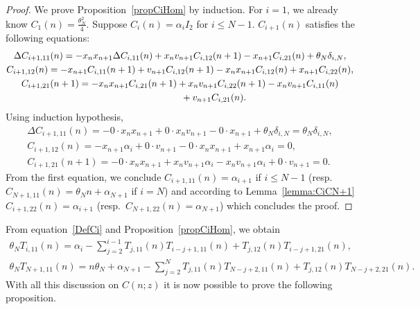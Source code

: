 \documentclass[pdftex]{sigma}%
\numberwithin{equation}{section}
\begin{document}
	\begin{proof}
		We prove Proposition~\ref{propCiHom} by induction.
		For $i=1$, we already know $C_1(n)=\frac{\theta_N^2}{4}$.
		Suppose $C_i(n)=\alpha_iI_2$ for $i\leqslant N-1$.
		$C_{i+1}(n)$ satisfies the following equations:
		\begin{gather*}
			\Delta C_{i+1,11}(n)=-x_nx_{n+1}\Delta C_{i,11}(n) +x_nv_{n+1}C_{i,12}(n+1)-x_{n+1}C_{i,21}(n)+\theta_N\delta_{i,N},
\\
C_{i+1,12}(n)=-x_{n+1}C_{i,11}(n+1)+v_{n+1}C_{i,12}(n+1)-x_nx_{n+1}C_{i,12}(n)+x_{n+1}C_{i,22}(n),
\\		
C_{i+1,21}(n+1)=-x_nx_{n+1}C_{i,21}(n+1)+x_nv_{n+1}C_{i,22}(n+1)-x_nv_{n+1}C_{i,11}(n)
\\ \hphantom{C_{i+1,21}(n+1)=}
{}+v_{n+1}C_{i,21}(n).
		\end{gather*}
		Using induction hypothesis,
		\begin{gather*}
			\Delta C_{i+1,11}(n)=-0 \cdot x_nx_{n+1} +0\cdot x_nv_{n+1}-0\cdot x_{n+1}+\theta_N\delta_{i,N}=\theta_N\delta_{i,N}, \\
			C_{i+1,12}(n)=-x_{n+1}\alpha_i+0\cdot v_{n+1}-0\cdot x_nx_{n+1}+x_{n+1}\alpha_i=0, \\
			C_{i+1,21}(n+1)=-0\cdot x_nx_{n+1}+x_nv_{n+1}\alpha_i-x_nv_{n+1}\alpha_i+0\cdot v_{n+1}=0.
		\end{gather*}
		From the first equation, we conclude $C_{i+1,11}(n)=\alpha_{i+1}$ if $i\leqslant N-1$ (resp.\ $C_{N+1,11}(n)=\theta_Nn+\alpha_{N+1}$ if $i=N$) and according to Lemma~\ref{lemma:CiCN+1} $C_{i+1,22}(n)=\alpha_{i+1}$ (resp.\ $C_{N+1,22}(n)=\alpha_{N+1}$) which concludes the proof.
\end{proof}

	From equation~\eqref{DefCi} and Proposition~\ref{propCiHom}, we obtain
\begin{gather}
\theta_NT_{i,11}(n)=\alpha_i-\sum_{j=2}^{i-1}T_{j,11}(n)T_{i-j+1,11}(n)+T_{j,12}(n)T_{i-j+1,21}(n),
\label{Ti11}
\\
\theta_NT_{N+1,11}(n)=n\theta_N+\alpha_{N+1}-\sum_{j=2}^{N}T_{j,11}(n)T_{N-j+2,11}(n)
+T_{j,12}(n)T_{N-j+2,21}(n).
\label{TN+111}
\end{gather}
With all this discussion on $C(n;z)$ it is now possible to prove the following proposition.
\end{document}
